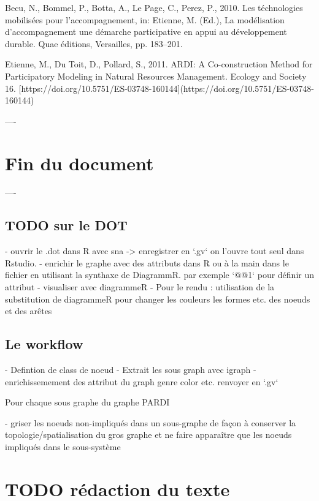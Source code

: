 Becu, N., Bommel, P., Botta, A., Le Page, C., Perez, P., 2010. Les téchnologies mobilisées pour l’accompagnement, in: Etienne, M. (Ed.), La modélisation d’accompagnement une démarche participative en appui au développement durable. Quae éditions, Versailles, pp. 183–201.

Etienne, M., Du Toit, D., Pollard, S., 2011. ARDI: A Co-construction Method for Participatory Modeling in Natural Resources Management. Ecology and Society 16. [https://doi.org/10.5751/ES-03748-160144](https://doi.org/10.5751/ES-03748-160144)

----

\section{ Fin du document }

----

\subsection{ TODO sur le DOT}



- ouvrir le .dot dans R avec sna -> enregistrer en `.gv` on l'ouvre tout seul dans Rstudio. 
- enrichir le graphe avec des attributs dans R ou à la main dans le fichier en utilisant la synthaxe de DiagrammR. par exemple `@@1` pour définir un attribut 
- visualiser avec diagrammeR
- Pour le rendu : utilisation de la substitution de diagrammeR pour changer les couleurs les formes etc.  des noeuds et des arêtes

\subsection{ Le workflow}
- Defintion de class de noeud
- Extrait les sous graph avec igraph
- enrichissemement des attribut du graph genre color etc.
renvoyer en `.gv`

Pour chaque sous graphe du graphe PARDI 

-  griser les noeuds non-impliqués dans un sous-graphe de façon à conserver la topologie/spatialisation du gros graphe et ne faire apparaître que les noeuds impliqués dans le sous-système



\section{TODO rédaction du texte }

